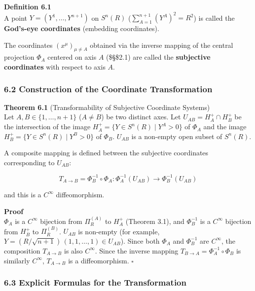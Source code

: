 \documentclass[a4paper,11pt]{article}
\theoremstyle{definition}
\begin{document}
\textbf{Definition 6.1}\\
A point \(Y = (Y^1, \ldots, Y^{n+1})\) on \(S^n(R)\) (\(\sum_{A=1}^{n+1}(Y^A)^2 = R^2\)) is called the \textbf{God's-eye coordinates} (embedding coordinates).

The coordinates \((x^\mu)_{\mu \neq A}\) obtained via the inverse mapping of the central projection \(\Phi_A\) centered on axis \(A\) (\$\S\$2.1) are called the \textbf{subjective coordinates} with respect to axis \(A\).

\subsubsection{6.2 Construction of the Coordinate Transformation}\label{construction-of-the-coordinate-transformation}

\textbf{Theorem 6.1} (Transformability of Subjective Coordinate Systems)\\
Let \(A, B \in \{1, \ldots, n+1\}\) (\(A \neq B\)) be two distinct axes. Let \(U_{AB} = H_A^+ \cap H_B^+\) be the intersection of the image \(H_A^+ = \{Y \in S^n(R) \mid Y^A > 0\}\) of \(\Phi_A\) and the image \(H_B^+ = \{Y \in S^n(R) \mid Y^B > 0\}\) of \(\Phi_B\). \(U_{AB}\) is a non-empty open subset of \(S^n(R)\).

A composite mapping is defined between the subjective coordinates corresponding to \(U_{AB}\):

\[T_{A \to B} = \Phi_B^{-1} \circ \Phi_A: \Phi_A^{-1}(U_{AB}) \to \Phi_B^{-1}(U_{AB}) \tag{6.1}\]

and this is a \(C^\infty\) diffeomorphism.

\textbf{Proof}\\
\(\Phi_A\) is a \(C^\infty\) bijection from \(\Pi_R^{(A)}\) to \(H_A^+\) (Theorem 3.1), and \(\Phi_B^{-1}\) is a \(C^\infty\) bijection from \(H_B^+\) to \(\Pi_R^{(B)}\). \(U_{AB}\) is non-empty (for example, \(Y = (R/\sqrt{n+1})\,(1,1,\ldots,1) \in U_{AB}\)). Since both \(\Phi_A\) and \(\Phi_B^{-1}\) are \(C^\infty\), the composition \(T_{A \to B}\) is also \(C^\infty\). Since the inverse mapping \(T_{B \to A} = \Phi_A^{-1} \circ \Phi_B\) is similarly \(C^\infty\), \(T_{A \to B}\) is a diffeomorphism. \(\square\)

\subsubsection{6.3 Explicit Formulas for the Transformation}\label{explicit-formulas-for-the-transformation}
\end{document}
